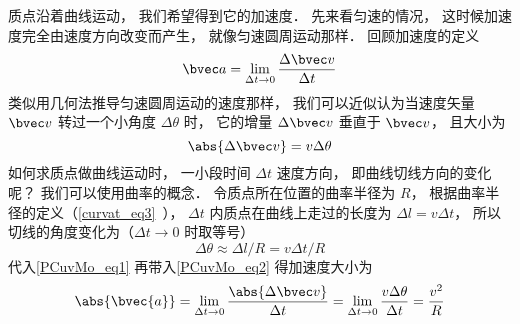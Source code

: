 

质点沿着曲线运动， 我们希望得到它的加速度． 先来看匀速的情况， 这时候加速度完全由速度方向改变而产生， 就像匀速圆周运动那样． 回顾加速度的定义
\begin{equation}\label{PCuvMo_eq2}
\bvec a = \lim_{\Delta t \to 0} \frac{\Delta \bvec v}{\Delta t}
\end{equation}
类似用几何法推导匀速圆周运动的速度那样， 我们可以近似认为当速度矢量 $\bvec v$ 转过一个小角度 $\Delta \theta$ 时， 它的增量 $\Delta \bvec v$ 垂直于 $\bvec v$， 且大小为
\begin{equation}\label{PCuvMo_eq1}
\abs{\Delta \bvec v} = v\Delta\theta
\end{equation}
如何求质点做曲线运动时， 一小段时间 $\Delta t$ 速度方向， 即曲线切线方向的变化呢？ 我们可以使用曲率的概念． 令质点所在位置的曲率半径为 $R$， 根据曲率半径的定义（\autoref{curvat_eq3}~）， $\Delta t$ 内质点在曲线上走过的长度为 $\Delta l = v \Delta t$， 所以切线的角度变化为（$\Delta t\to 0$ 时取等号）
\begin{equation}
\Delta \theta \approx \Delta l/R = v \Delta t/R
\end{equation}
代入\autoref{PCuvMo_eq1} 再带入\autoref{PCuvMo_eq2} 得加速度大小为
\begin{equation}
\abs{\bvec{a}} = \lim_{\Delta t \to 0} \frac{\abs{\Delta \bvec v}}{\Delta t}
= \lim_{\Delta t \to 0}  \frac{v\Delta\theta}{\Delta t} = \frac{v^2}{R}
\end{equation}
